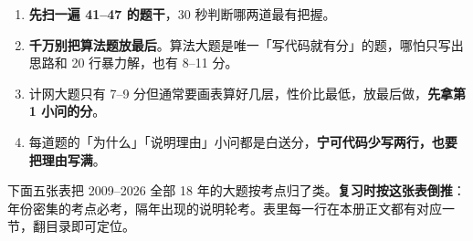 \documentclass[10pt,a4paper]{ctexart}
\begin{document}



\begin{enumerate}

\item \textbf{先扫一遍 41--47 的题干}，30 秒判断哪两道最有把握。

\item \textbf{千万别把算法题放最后}。算法大题是唯一「写代码就有分」的题，哪怕只写出思路和 20 行暴力解，也有 8--11 分。

\item 计网大题只有 7--9 分但通常要画表算好几层，性价比最低，放最后做，\textbf{先拿第 1 小问的分}。

\item 每道题的「为什么」「说明理由」小问都是白送分，\textbf{宁可代码少写两行，也要把理由写满}。

\end{enumerate}


下面五张表把 2009--2026 全部 18 年的大题按考点归了类。\textbf{复习时按这张表倒推}：年份密集的考点必考，隔年出现的说明轮考。表里每一行在本册正文都有对应一节，翻目录即可定位。

\end{document}
